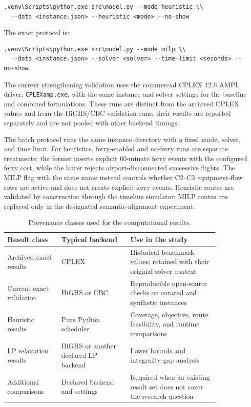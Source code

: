 \begin{verbatim}
.venv\Scripts\python.exe src\model.py --mode heuristic \\
  --data <instance.json> --heuristic <mode> --no-show
\end{verbatim}

The exact protocol is:

\begin{verbatim}
.venv\Scripts\python.exe src\model.py --mode milp \\
  --data <instance.json> --solver <solver> --time-limit <seconds> --no-show
\end{verbatim}

The current strengthening validation uses the commercial CPLEX 12.6 AMPL
driver, \texttt{CPLEXamp.exe}, with the same instance and solver settings for
the baseline and combined formulations. These runs are distinct from the
archived CPLEX values and from the HiGHS/CBC validation runs; their results
are reported separately and are not pooled with other backend timings.

The batch protocol runs the same instance directory with a fixed mode, solver,
and time limit. For heuristics, ferry-enabled and no-ferry runs are separate
treatments: the former inserts explicit 60-minute ferry events with the
configured ferry cost, while the latter rejects airport-disconnected successive
flights. The MILP flag with the same name instead controls whether C2--C3
equipment-flow rows are active and does not create explicit ferry events.
Heuristic routes are validated by construction through the timeline simulator;
MILP routes are replayed only in the designated semantic-alignment experiment.

\begin{table}[t]
\centering\small
\caption{Provenance classes used for the computational results.}
\label{tab:computational_provenance}
\begin{tabular}{p{0.22\linewidth}p{0.28\linewidth}p{0.36\linewidth}}
\toprule
Result class & Typical backend & Use in the study \\
\midrule
Archived exact results & CPLEX & Historical benchmark values; retained with their original solver context \\
Current exact validation & HiGHS or CBC & Reproducible open-source checks on curated and synthetic instances \\
Heuristic results & Pure Python scheduler & Coverage, objective, route feasibility, and runtime comparisons \\
LP relaxation results & HiGHS or another declared LP backend & Lower bounds and integrality-gap analysis \\
Additional comparisons & Declared backend and settings & Required when an existing result set does not cover the research question \\
\bottomrule
\end{tabular}
\end{table}

